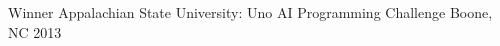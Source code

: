 \begin{cvhonors}
  \cvhonor
    {Winner}
    {Appalachian State University: Uno AI Programming Challenge}
    {Boone, NC}
    {2013}
\end{cvhonors}
